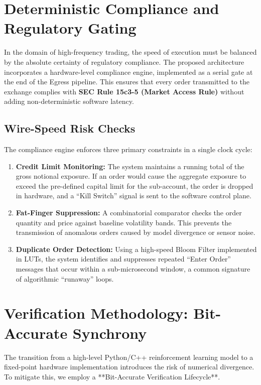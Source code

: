 \section{Deterministic Compliance and Regulatory Gating}
In the domain of high-frequency trading, the speed of execution must be balanced by the absolute certainty of regulatory compliance. The proposed architecture incorporates a hardware-level compliance engine, implemented as a serial gate at the end of the Egress pipeline. This ensures that every order transmitted to the exchange complies with \textbf{SEC Rule 15c3-5 (Market Access Rule)} without adding non-deterministic software latency.

\subsection{Wire-Speed Risk Checks}
The compliance engine enforces three primary constraints in a single clock cycle:
\begin{enumerate}
    \item \textbf{Credit Limit Monitoring:} The system maintains a running total of the gross notional exposure. If an order would cause the aggregate exposure to exceed the pre-defined capital limit for the sub-account, the order is dropped in hardware, and a ``Kill Switch'' signal is sent to the software control plane.
    \item \textbf{Fat-Finger Suppression:} A combinatorial comparator checks the order quantity and price against baseline volatility bands. This prevents the transmission of anomalous orders caused by model divergence or sensor noise.
    \item \textbf{Duplicate Order Detection:} Using a high-speed Bloom Filter implemented in LUTs, the system identifies and suppresses repeated ``Enter Order'' messages that occur within a sub-microsecond window, a common signature of algorithmic ``runaway'' loops.
\end{enumerate}

\section{Verification Methodology: Bit-Accurate Synchrony}
The transition from a high-level Python/C++ reinforcement learning model to a fixed-point hardware implementation introduces the risk of numerical divergence. To mitigate this, we employ a **Bit-Accurate Verification Lifecycle**.

